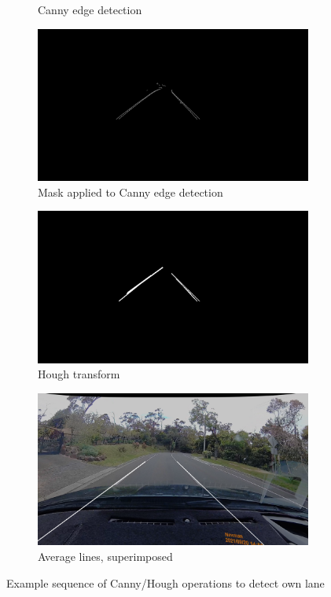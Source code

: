 \documentclass[11pt,twoside]{report}
\begin{document}
\begin{figure}[h]
\begin{subfigure}{0.4\textwidth}
	\caption{Canny edge detection}
\end{subfigure}
\hfill
\begin{subfigure}{0.4\textwidth}
	\includegraphics[width=\textwidth]{f009_canny_cropped.png}
	\caption{Mask applied to Canny edge detection}
\end{subfigure}
\hfill
\begin{subfigure}{0.4\textwidth}
	\includegraphics[width=\textwidth]{f009_hough.png}
	\caption{Hough transform}
\end{subfigure}
\hfill
\begin{subfigure}{0.4\textwidth}
	\includegraphics[width=\textwidth]{f009_own_lane.png}
	\caption{Average lines, superimposed}
\end{subfigure}
\caption{Example sequence of Canny/Hough operations to detect own lane}
\label{fig:009}
\end{figure}
\end{document}

